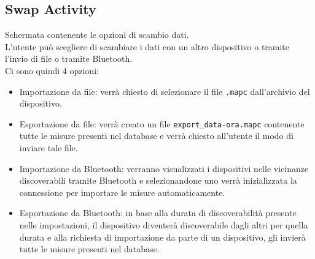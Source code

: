 \documentclass[11pt]{article}
\begin{document}
\subsection{Swap Activity}
\label{sec:swapActivity}
Schermata contenente le opzioni di scambio dati. \\
L'utente può scegliere di scambiare i dati con un altro dispositivo o tramite l'invio di file o tramite Bluetooth. \\
Ci sono quindi 4 opzioni:
\begin{itemize}
    \item Importazione da file: verrà chiesto di selezionare il file \texttt{.mapc} dall'archivio del dispositivo.
    \item Esportazione da file: verrà creato un file \texttt{export\_data-ora.mapc} contenente tutte le misure presenti nel database e verrà chiesto all'utente il modo di inviare tale file.
    \item Importazione da Bluetooth: verranno visualizzati i dispositivi nelle vicinanze discoverabili tramite Bluetooth e selezionandone uno verrà inizializzata la connessione per importare le misure automaticamente.
    \item Esportazione da Bluetooth: in base alla durata di discoverabilità presente nelle impostazioni, il dispositivo diventerà discoverabile dagli altri per quella durata e alla richiesta di importazione da parte di un dispositivo, gli invierà tutte le misure presenti nel database.
\end{itemize}
\end{document}

